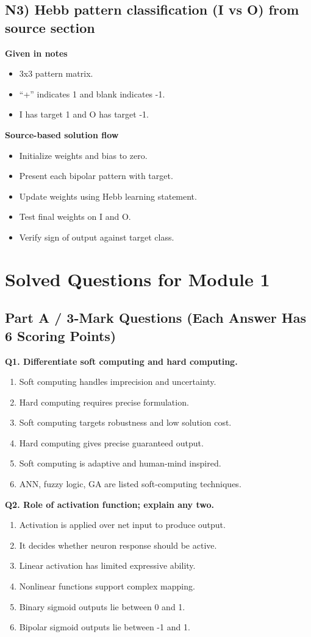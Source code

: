 \documentclass[11pt,a4paper]{article}
\begin{document}
\subsection*{N3) Hebb pattern classification (I vs O) from source section}
\textbf{Given in notes}
\begin{itemize}
\item 3x3 pattern matrix.
\item ``+'' indicates 1 and blank indicates -1.
\item I has target 1 and O has target -1.
\end{itemize}

\textbf{Source-based solution flow}
\begin{itemize}
\item Initialize weights and bias to zero.
\item Present each bipolar pattern with target.
\item Update weights using Hebb learning statement.
\item Test final weights on I and O.
\item Verify sign of output against target class.
\end{itemize}

\section*{Solved Questions for Module 1}

\subsection*{Part A / 3-Mark Questions (Each Answer Has 6 Scoring Points)}

\textbf{Q1. Differentiate soft computing and hard computing.}
\begin{enumerate}
\item Soft computing handles imprecision and uncertainty.
\item Hard computing requires precise formulation.
\item Soft computing targets robustness and low solution cost.
\item Hard computing gives precise guaranteed output.
\item Soft computing is adaptive and human-mind inspired.
\item ANN, fuzzy logic, GA are listed soft-computing techniques.
\end{enumerate}

\textbf{Q2. Role of activation function; explain any two.}
\begin{enumerate}
\item Activation is applied over net input to produce output.
\item It decides whether neuron response should be active.
\item Linear activation has limited expressive ability.
\item Nonlinear functions support complex mapping.
\item Binary sigmoid outputs lie between 0 and 1.
\item Bipolar sigmoid outputs lie between -1 and 1.
\end{enumerate}
\end{document}
